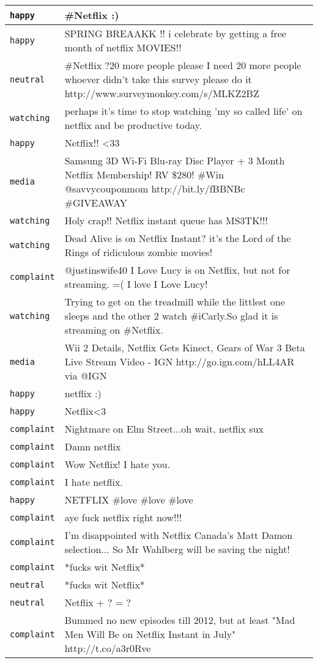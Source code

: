 {\begin{longtable}{|l|p{160mm}|}
      \tabularnewline\hline
         \texttt{happy} & \#Netflix :)
      \tabularnewline\hline
         \texttt{happy} & SPRING BREAAKK !! i celebrate by getting a free month of netflix MOVIES!!
      \tabularnewline\hline
         \texttt{neutral} & \#Netflix ?20 more people please I need 20 more people whoever didn't take this survey please do it http://www.surveymonkey.com/s/MLKZ2BZ
      \tabularnewline\hline
         \texttt{watching} & perhaps it's time to stop watching 'my so called life' on netflix and be productive today.
      \tabularnewline\hline
         \texttt{happy} & Netflix!! <33
      \tabularnewline\hline
         \texttt{media} & Samsung 3D Wi-Fi Blu-ray Disc Player + 3 Month Netflix Membership! RV \$280! \#Win @savvycouponmom http://bit.ly/fBBNBc \#GIVEAWAY
      \tabularnewline\hline
         \texttt{watching} & Holy crap!! Netflix instant queue has MS3TK!!!
      \tabularnewline\hline
         \texttt{watching} & Dead Alive is on Netflix Instant? it's the Lord of the Rings of ridiculous zombie movies!
      \tabularnewline\hline
         \texttt{complaint} & @justinswife40 I Love Lucy is on Netflix, but not for streaming. =( I love I Love Lucy!
      \tabularnewline\hline
         \texttt{watching} & Trying to get on the treadmill while the littlest one sleeps and the other 2 watch \#iCarly.So glad it is streaming on \#Netflix.
      \tabularnewline\hline
         \texttt{media} & Wii 2 Details, Netflix Gets Kinect, Gears of War 3 Beta Live Stream Video - IGN http://go.ign.com/hLL4AR via @IGN
      \tabularnewline\hline
         \texttt{happy} & netflix :)
      \tabularnewline\hline
         \texttt{happy} & Netflix<3
      \tabularnewline\hline
         \texttt{complaint} & Nightmare on Elm Street...oh wait, netflix sux
      \tabularnewline\hline
         \texttt{complaint} & Damn netflix
      \tabularnewline\hline
         \texttt{complaint} & Wow Netflix! I hate you.
      \tabularnewline\hline
         \texttt{complaint} & I hate netflix.
      \tabularnewline\hline
         \texttt{happy} & NETFLIX \#love \#love \#love
      \tabularnewline\hline
         \texttt{complaint} & aye fuck netflix right now!!!
      \tabularnewline\hline
         \texttt{complaint} & I'm disappointed with Netflix Canada's Matt Damon selection... So Mr Wahlberg will be saving the night!
      \tabularnewline\hline
         \texttt{complaint} & *fucks wit Netflix*
      \tabularnewline\hline
         \texttt{neutral} & *fucks wit Netflix*
      \tabularnewline\hline
         \texttt{neutral} & Netflix + ? = ?
      \tabularnewline\hline
         \texttt{complaint} & Bummed no new episodes till 2012, but at least "Mad Men Will Be on Netflix Instant in July" http://t.co/a3r0Rve

\end{longtable}}
